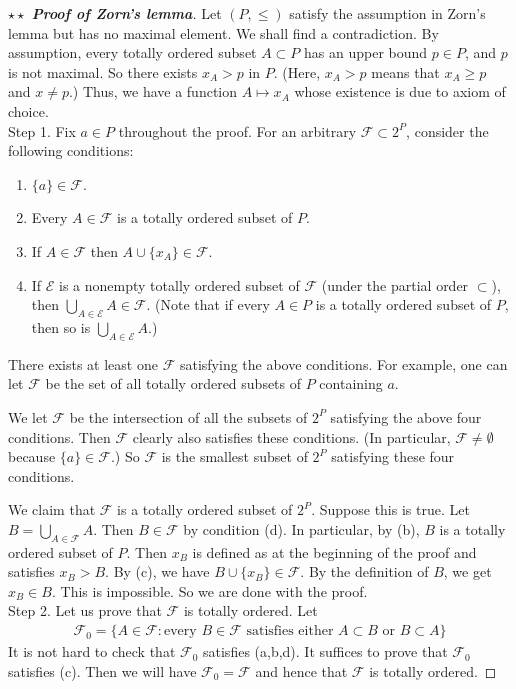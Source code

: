 \documentclass[12pt,b5paper,notitlepage]{article}
\theoremstyle{definition}
\theoremstyle{plain}
\newcommand{\mc}{\mathcal}
\numberwithin{equation}{section}
\begin{document}
\begin{proof}[$\star\star$ \textbf{Proof of Zorn's lemma}]
Let $(P,\leq)$ satisfy the assumption in Zorn's lemma but has no maximal element. We shall find a contradiction. By assumption, every totally ordered subset $A\subset P$ has an upper bound $p\in P$, and $p$ is not maximal. So there exists $x_A>p$ in $P$. (Here, $x_A>p$ means that $x_A\geq p$ and $x\neq p$.) Thus, we have a function $A\mapsto x_A$ whose existence is due to axiom of choice.\\[-1ex]

Step 1. Fix $a\in P$ throughout the proof. For an arbitrary $\mc F\subset 2^P$, consider the following conditions:
\begin{enumerate}[label=(\alph*)]
\item $\{a\}\in\mc F$.
\item Every $A\in \mc F$ is a totally ordered subset of $P$.  %
\item If $A\in\mc F$ then $A\cup\{x_A\}\in\mc F$.
\item If $\mc E$ is a nonempty totally ordered subset of $\mc F$ (under the partial order $\subset$), then $\bigcup_{A\in\mc E}A\in\mc F$. (Note that if every $A\in P$ is a totally ordered subset of $P$, then so is $\bigcup_{A\in\mc E}A$.)
\end{enumerate}
There exists at least one $\mc F$ satisfying the above conditions. For example, one can let $\mc F$ be the set of all totally ordered subsets of $P$ containing $a$. 

We let $\mc F$ be the intersection of all the subsets of $2^P$ satisfying the above four conditions. Then $\mc F$ clearly also satisfies these conditions. (In particular, $\mc F\neq\emptyset$ because $\{a\}\in\mc F$.) So $\mc F$ is the smallest subset of $2^P$ satisfying these four conditions.

We claim that $\mc F$ is a totally ordered subset of $2^P$. Suppose this is true. Let $B=\bigcup_{A\in\mc F}A$. Then $B\in\mc F$ by condition (d). In particular, by (b), $B$ is a totally ordered subset of $P$. Then $x_B$ is defined as at the beginning of the proof and satisfies $x_B>B$. By (c), we have $B\cup\{x_B\}\in\mc F$. By the definition of $B$, we get $x_B\in B$. This is impossible. So we are done with the proof.\\[-1ex]

Step 2. Let us prove that $\mc F$ is totally ordered. Let
\begin{align*}
\mc F_0=\{A\in\mc F:\text{every }B\in\mc F\text{ satisfies either }A\subset B\text{ or }B\subset A\}
\end{align*}
It is not hard to check that $\mc F_0$ satisfies (a,b,d). It suffices to prove that $\mc F_0$ satisfies (c). Then we will have $\mc F_0=\mc F$ and hence that $\mc F$ is totally ordered.


\end{proof}
\end{document}

